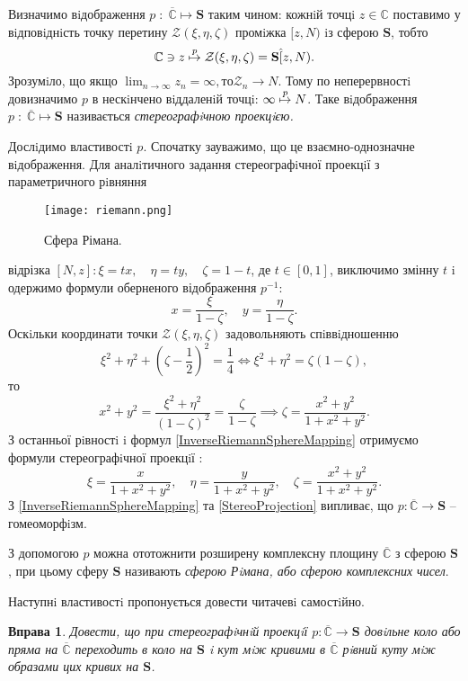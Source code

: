 \documentclass[10pt]{report} %
\let\oldlim\lim
\renewcommand{\lim}{\displaystyle\oldlim}
\newtheorem{exercise}{Вправа}
\begin{document}
Визначимо вiдображення $p\;:\;\overline{\mathbb{C}} \mapsto \mathbf{S}$ таким чином: кожнiй точцi $z\in \mathbb{C}$ поставимо у
вiдповiднiсть точку перетину $\mathcal{Z}(\xi, \eta, \zeta)$ промiжка $[z, N )$ iз сферою $\mathbf{S}$, тобто
\[\mathbb{C}\ni z\;{\buildrel{p}\over\mapsto}\;\mathcal{Z}(\xi,\eta,\zeta)=\mathbf{S}\hat [z,N).\]
Зрозумiло, що якщо $\lim_{n\to\infty} z_n = \infty, то \mathcal{Z}_n\to N$. Тому по неперервностi довизначимо $p$ в нескiнчено вiддаленiй точцi:
$\infty\;{\buildrel{p}\over\mapsto}\;N$. Таке вiдображення $p\;:\;\overline{\mathbb{C}} \mapsto \mathbf{S}$ називається
\textit{стереографiчною проекцiєю.}

Дослiдимо властивостi $p$. Спочатку зауважимо, що це взаємно-однозначне вiдображення. Для аналiтичного задання стереографiчної проекцiї
 з параметричного рiвняння\newpage
\begin{figure}[h!]
\centering
\texttt{[image: riemann.png]}
\caption{Сфера Рімана.}
\label{RiemannSphere}
\end{figure}
\noindent відрізка $[N,z]:\xi=tx,\quad\eta=ty,\quad\zeta=1-t$, де $t\in[0,1]$, виключимо змінну $t$ i одержимо
формули оберненого відображення $p^{-1}$:
\begin{equation}\label{InverseRiemannSphereMapping}x=\frac{\xi}{1-\zeta},\quad y=\frac{\eta}{1-\zeta}.\end{equation}
Оскiльки координати точки $\mathcal{Z}(\xi,\eta,\zeta)$ задовольняють спiввiдношенню
\[\xi^2+\eta^2+{\left(\zeta-\frac{1}{2}\right)}^2=\frac{1}{4}\iff \xi^2+\eta^2=\zeta(1-\zeta),\]
то
\[x^2+y^2=\frac{\xi^2+\eta^2}{{(1-\zeta)}^2}=\frac{\zeta}{1-\zeta}\implies \zeta=\frac{x^2+y^2}{1+x^2+y^2}.\]
З останньої рiвностi i формул \eqref{InverseRiemannSphereMapping} отримуємо формули стереографiчної проекцiї :
\begin{equation}\label{StereoProjection}\xi=\frac{x}{1+x^2+y^2},\quad\eta=\frac{y}{1+x^2+y^2},\quad\zeta=\frac{x^2+y^2}{1+x^2+y^2}.\end{equation}
З \eqref{InverseRiemannSphereMapping} та \eqref{StereoProjection} випливає, що $p:\overline{\mathbb{C}}\to\mathbf{S}$ – гомеоморфiзм.

З допомогою $p$ можна ототожнити розширену комплексну площину $\overline{\mathbb{C}}$ з сферою $\mathbf{S}$,
при цьому сферу $\mathbf{S}$ називають \textit{сферою Рiмана, або сферою комплексних чисел}.

Наступнi властивостi пропонується довести читачевi самостiйно.
\begin{exercise}\label{ProjectionPreservesCirclesAndAnglesExercise}
Довести, що при стереографiчнiй проекцiї $p:\overline{\mathbb{C}}\to\mathbf{S}$ довiльне коло або
пряма на $\overline{\mathbb{C}}$ переходить в коло на $\mathbf{S}$ i кут мiж кривими в $\overline{\mathbb{C}}$ рiвний куту мiж
образами цих кривих на $\mathbf{S}$.
\end{exercise}
\end{document}
